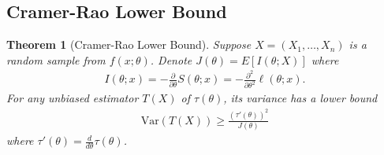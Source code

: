 \documentclass[11pt]{amsart}
\newtheorem{theorem}{Theorem}[section]
\theoremstyle{definition}
\numberwithin{equation}{section}
\begin{document}
\subsection{Cramer-Rao Lower Bound}
\begin{theorem}[Cramer-Rao Lower Bound]
    Suppose $X=(X_1,\ldots,X_n)$ is a random sample from $f(x;\theta)$. Denote $J(\theta)=E[I(\theta;X)]$ where 
    \begin{align*}
        I(\theta;x)=-\frac{\partial }{\partial\theta}S(\theta;x)=-\frac{\partial^2}{\partial\theta^2}\ell(\theta;x).
    \end{align*}
    For any unbiased estimator $T(X)$ of $\tau(\theta)$, its variance has a lower bound 
    \begin{align*}
        \mathrm{Var}(T(X))\ge\frac{(\tau'(\theta))^2}{J(\theta)}
    \end{align*}
    where $\tau'(\theta)=\frac{d}{d\theta}\tau(\theta)$.
\end{theorem}
\end{document}
